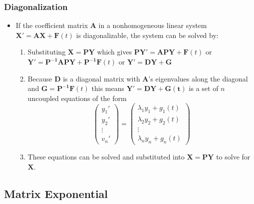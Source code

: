 \documentclass{article}
\begin{document}
\subsubsection{Diagonalization}

\begin{itemize}
  \item If the coefficient matrix $\mathbf{A}$ in a nonhomogeneous linear system \\ $\mathbf{X' = A X + F}(t)$ is diagonalizable, the system can be solved by:

        \begin{enumerate}
          \item Substituting $\mathbf{X = P Y}$ which gives $\mathbf{P Y' = A P Y + F}(t)$ or \\ $\mathbf{Y' = P^{-1} A P Y + P^{-1} F}(t)$ or $\mathbf{Y' = D Y + G}$

          \item Because $\mathbf{D}$ is a diagonal matrix with $\mathbf{A}$'s eigenvalues along the diagonal and $\mathbf{G = P^{-1} F}(t)$ this means $\mathbf{Y' = D Y + G(t)}$ is a set of $n$ uncoupled equations of the form \[\begin{pmatrix}
                    y_1'   \\
                    y_2'   \\
                    \vdots \\
                    v_n'
                  \end{pmatrix} = \begin{pmatrix}
                    \lambda_1 y_1 + g_1(t) \\
                    \lambda_2 y_2 + g_2(t) \\
                    \vdots                 \\
                    \lambda_n y_n + g_n(t)
                  \end{pmatrix}\]

          \item These equations can be solved and substituted into $\mathbf{X = P Y}$ to solve for $\mathbf{X}$.
        \end{enumerate}
\end{itemize}

\subsection{Matrix Exponential}
\end{document}
